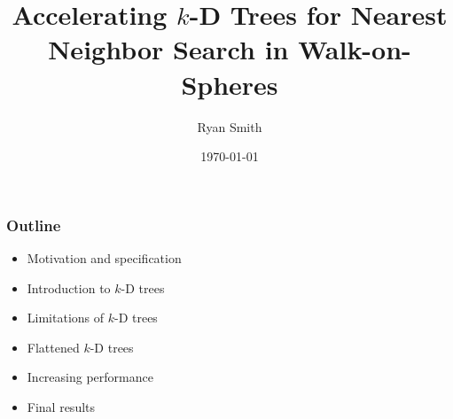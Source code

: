 \documentclass[lualatex,aspectratio=169]{beamer}
\title{Accelerating $k$-D Trees for Nearest Neighbor Search in Walk-on-Spheres}
\date[\today]{\today}
\author[Ryan Smith]{Ryan Smith}
\newcommand{\kd}{$k$-D\xspace}
\begin{document}
\begin{frame}
  \titlepage
\end{frame}

\begin{frame} 

  \frametitle{Outline} 

  \begin{itemize} 
    \item Motivation and specification
    \item Introduction to \kd trees
    \item Limitations of \kd trees
    \item Flattened \kd trees
    \item Increasing performance
    \item Final results
  \end{itemize}

\end{frame}










\end{document}
